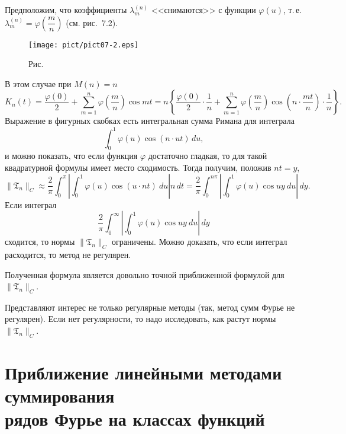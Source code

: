 Предположим, что коэффициенты $\lambda_m^{(n)}$ <<снимаются>> с функции
$\varphi(u)$, т.\,е. $\lambda_m^{(n)}=\varphi\left( \dfrac{m}{n}
\right)$ (см. {рис.~7.2}).



\begin{figure}[ht]
\begin{center}
\texttt{[image: pict/pict07-2.eps]}
\end{center}
 \bigskip
 \label{r7-2}

 \centerline{Рис.~\theris}
 \bigskip
\end{figure}





В этом случае {при $M(n)=n$}
$$
K_n(t)=\frac{\varphi(0)}{2}+\sum\limits_{m=1}^n \varphi\left( \frac{m}{n}
\right) \cos mt=n\left\{
\frac{\varphi(0)}{2}\cdot\frac{1}{n}+\sum\limits_{m=1}^n \varphi\left(
\frac{m}{n} \right) \cos\left(n \cdot \frac{mt}{n}\right)\cdot \frac{1}{n}
\right\}.
$$
Выражение {в фигурных скобках} есть интегральная сумма Римана для интеграла
$$
\int_{0}^1\varphi(u)\cos(n\cdot ut)\, du,
$$
и можно показать, что если функция $\varphi$ достаточно гладкая, то для такой
квадратурной формулы имеет место сходимость. Тогда получим, положив
$nt=y$,
$$
\|{\mathfrak{T}}_n\|_C\approx \frac{2}{\pi} \int_0^{\pi} \left|
\int_0^1 \varphi(u) \cos(u\cdot nt)\ du \right|n\, dt=
\frac{2}{\pi} \int_0^{n\pi} \left|
\int_0^1 \varphi(u) \cos uy\ du \right|\, dy.
$$
Если интеграл
$$
\frac{2}{\pi} \int_0^{\infty} \left|
\int_0^1 \varphi(u) \cos uy \ {du}\right|\, dy
$$
сходится, то нормы $\|{\mathfrak{T}}_n\|_C$ ограничены.
Можно доказать, что если интеграл расходится, то метод {не регулярен}.

\begin{Remark}
Полученная формула является {довольно} точной приближенной формулой для
$\|{\mathfrak{T}}_n\|_C$.
\end{Remark}

Представляют интерес не только регулярные методы (так, метод сумм Фурье {не регулярен}).
Если нет регулярности, то надо исследовать, как
растут нормы $\|{\mathfrak{T}}_n\|_C$.


\section{Приближение линейными методами суммирования\\ рядов Фурье на классах
функций}

